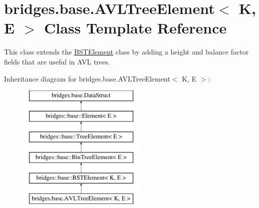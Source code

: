 \hypertarget{classbridges_1_1base_1_1_a_v_l_tree_element}{}\section{bridges.\+base.\+A\+V\+L\+Tree\+Element$<$ K, E $>$ Class Template Reference}
\label{classbridges_1_1base_1_1_a_v_l_tree_element}


This class extends the \hyperlink{classbridges_1_1base_1_1_b_s_t_element}{B\+S\+T\+Element} class by adding a height and balance factor fields that are useful in A\+V\+L trees.  


Inheritance diagram for bridges.\+base.\+A\+V\+L\+Tree\+Element$<$ K, E $>$\+:\begin{figure}[H]
\begin{center}
\leavevmode
\includegraphics[height=6.000000cm]{classbridges_1_1base_1_1_a_v_l_tree_element}
\end{center}
\end{figure}
